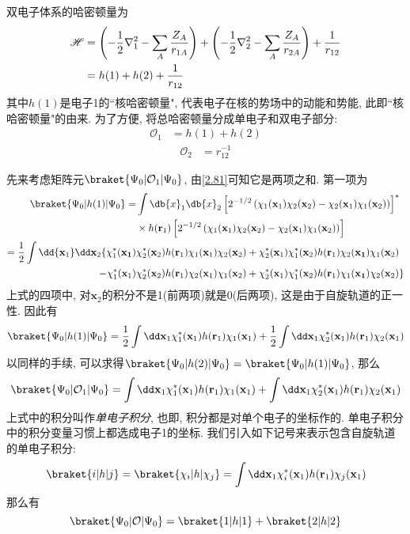 双电子体系的哈密顿量为
\begin{align}
\mathscr{H}&=\left( -\frac{1}{2}\nabla_1^2 - \sum_A\frac{Z_A}{r_{1A}} \right) + \left( -\frac{1}{2}\nabla_2^2 - \sum_A\frac{Z_A}{r_{2A}} \right) + \frac{1}{r_{12}}\notag\\
&=h(1) + h(2) + \frac{1}{r_{12}}
\end{align}
其中$h(1)$是电子1的``核哈密顿量", 
代表电子在核的势场中的动能和势能, 
此即``核哈密顿量"的由来. 
为了方便, 
将总哈密顿量分成单电子和双电子部分:
\begin{align}
\mathcal{O}_1&=h(1)+h(2)
\label{2.81}
\end{align}
\begin{align}
\mathcal{O}_2&=r_{12}^{-1}
\end{align}

先来考虑矩阵元$\braket{\Psi_0|\mathcal{O}_1|\Psi_0}$, 
由\autoref{2.81}可知它是两项之和. 
第一项为
\begin{align}
\braket{\Psi_0|h(1)|\Psi_0}=&\int\db{x}_1\db{x}_2\left[2^{-1/2}\left(\chi_1(\mathbf{x}_1)\chi_2(\mathbf{x}_2)-\chi_2(\mathbf{x}_1)\chi_1(\mathbf{x}_2)\right)\right]^*\notag\\
\qquad&\times h(\mathbf{r}_1)\left[ 2^{-1/2}\left(\chi_1(\mathbf{x}_1)\chi_2(\mathbf{x}_2)-\chi_2(\mathbf{x}_1)\chi_1(\mathbf{x}_2)\right)\right]\notag\\
=\frac{1}{2}\int\dd{\mathbf{x}_1}\dd\mathbf{x}_2\{\chi_1^*(\mathbf{x_1})&\chi_2^*(\mathbf{x}_2)h(\mathbf{r}_1)\chi_1(\mathbf{x}_1)\chi_2(\mathbf{x}_2) + \chi_2^*(\mathbf{x}_1)\chi_1^*(\mathbf{x}_2)h(\mathbf{r}_1)\chi_2(\mathbf{x_1})\chi_1(\mathbf{x}_2) \notag\\
 - \chi_1^*(\mathbf{x}_1)&\chi_2^*(\mathbf{x}_2)h(\mathbf{r}_1)\chi_2(\mathbf{x}_1)\chi_1(\mathbf{x}_2) + \chi_2^*(\mathbf{x}_1)\chi_1^*(\mathbf{x}_2)h(\mathbf{r}_1)\chi_1(\mathbf{x_1})\chi_2(\mathbf{x}_2)
\}
\end{align}
上式的四项中, 
对$\mathbf{x}_2$的积分不是1(前两项)就是0(后两项), 
这是由于自旋轨道的正一性. 
因此有
\begin{equation}
\braket{\Psi_0|h(1)|\Psi_0}=\frac{1}{2}\int\dd\mathbf{x}_1\chi_1^*(\mathbf{x}_1)h(\mathbf{r}_1)\chi_1(\mathbf{x}_1)+\frac{1}{2}\int\dd\mathbf{x}_1\chi_2^*(\mathbf{x}_1)h(\mathbf{r}_1)\chi_2(\mathbf{x}_1)
\end{equation}
以同样的手续, 
可以求得$\braket{\Psi_0|h(2)|\Psi_0}=\braket{\Psi_0|h(1)|\Psi_0}$, 
那么
\begin{equation}
\braket{\Psi_0|\mathcal{O}_1|\Psi_0}=\int\dd\mathbf{x}_1\chi_1^*(\mathbf{x}_1)h(\mathbf{r}_1)\chi_1(\mathbf{x}_1) + \int\dd\mathbf{x}_1\chi_2^*(\mathbf{x}_1)h(\mathbf{r}_1)\chi_2(\mathbf{x}_1)
\end{equation}
上式中的积分叫作\emph{单电子积分}, 
也即, 
积分都是对单个电子的坐标作的. 
单电子积分中的积分变量习惯上都选成电子1的坐标. 
我们引入如下记号来表示包含自旋轨道的单电子积分:
\begin{equation}
\braket{i|h|j}=\braket{\chi_i|h|\chi_j}=\int\dd\mathbf{x}_1\chi_i^*(\mathbf{x}_1)h(\mathbf{r}_1)\chi_j(\mathbf{x}_1)
\end{equation}
那么有
\begin{equation}
\braket{\Psi_0|\mathcal{O}|\Psi_0}=\braket{1|h|1}+\braket{2|h|2}
\end{equation}

